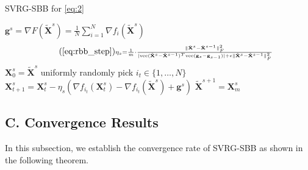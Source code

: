 \documentclass[letterpaper]{article} %
\begin{document}
\begin{algorithm}[ht]
	\caption{SVRG-SBB for \eqref{eq:2}}
	\label{alg:svrg-bb}
	{
		$\scriptstyle \mathbf{g}^{s} = \nabla F(\tilde{\mathbf{X}}^s) =\frac{1}{N}\sum^N_{i=1}\nabla f_i(\tilde{\mathbf{X}}^s)$\;
		{
			\begin{equation}
				\scriptstyle
				\tag{\ref{eq:rbb_step}}
				\eta_{s} = \frac{1}{m}\cdot\frac{\|\tilde{\mathbf{X}}^{s}-\tilde{\mathbf{X}}^{s-1}\|^2_F}{|\text{vec}(\tilde{\mathbf{X}}^{s}-\tilde{\mathbf{X}}^{s-1})^T\text{vec}(\mathbf{g}_s-\mathbf{g}_{s-1})|+\epsilon\|\tilde{\mathbf{X}}^{s}-\tilde{\mathbf{X}}^{s-1}\|^2_F}\;
			\end{equation}
		}
		$\scriptstyle\mathbf{X}^{s}_0=\tilde{\mathbf{X}}^s$\;
		{
			uniformly randomly pick $\scriptstyle i_t\in \{1,\ldots,N\}$\;
			$\scriptstyle\mathbf{X}^{s}_{t+1}= \mathbf{X}^{s}_{t}-\eta_{s}(\nabla f_{i_t}(\mathbf{X}^{s}_{t})-\nabla f_{i_t}(\tilde{\mathbf{X}}^s)+\mathbf{g}^{s})$\;
		}
		$\scriptstyle \tilde{\mathbf{X}}^{s+1}=\mathbf{X}^{s}_{m}$\;
	}
\end{algorithm}

\subsection{C. Convergence Results}

In this subsection, we establish the convergence rate of SVRG-SBB as shown in the following theorem.
\end{document}
